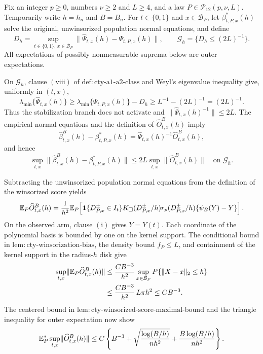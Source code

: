 Fix an integer \(p\geq0\), numbers \(\nu\geq2\) and \(L\geq4\), and a law \(P\in\mathcal P_{12}(p,\nu,L)\).  Temporarily write \(h=h_n\) and \(B=B_n\).  For \(t\in\{0,1\}\) and \(x\in\mathcal B_P\), let \(\beta^*_{t,P,x}(h)\) solve the original, unwinsorized population normal equations, and define
\[
 D_h=\sup_{t\in\{0,1\},\,x\in\mathcal B_P}
 \lVert\widehat\Psi_{t,x}(h)-\Psi_{t,P,x}(h)\rVert,
 \qquad
 \mathcal G_h=\{D_h\leq(2L)^{-1}\}.
\]
All expectations of possibly nonmeasurable suprema below are outer expectations.

On \(\mathcal G_h\), clause \(\mathrm{(viii)}\) of \(\mathrm{def:cty\text{-}a1\text{-}a2\text{-}class}\) and Weyl's eigenvalue inequality give, uniformly in \((t,x)\),
\[
 \lambda_{\min}\{\widehat\Psi_{t,x}(h)\}
 \geq \lambda_{\min}\{\Psi_{t,P,x}(h)\}-D_h
 \geq L^{-1}-(2L)^{-1}=(2L)^{-1}.
\]
Thus the stabilization branch does not activate and \(\lVert\widehat\Psi_{t,x}(h)^{-1}\rVert\leq2L\).  The empirical normal equations and the definition of \(\widehat O^B_{t,x}(h)\) imply
\[
 \widehat\beta^B_{t,x}(h)-\beta^*_{t,P,x}(h)
 =\widehat\Psi_{t,x}(h)^{-1}\widehat O^B_{t,x}(h),
\]
and hence
\[
 \sup_{t,x}\lVert\widehat\beta^B_{t,x}(h)-\beta^*_{t,P,x}(h)\rVert
 \leq 2L\sup_{t,x}\lVert\widehat O^B_{t,x}(h)\rVert
 \quad\text{on }\mathcal G_h.
\]

Subtracting the unwinsorized population normal equations from the definition of the winsorized score yields
\[
 \mathbb E_P\widehat O^B_{t,x}(h)
 ={1\over h^2}\mathbb E_P\!\left[
 \mathbf1\{D^{\pm}_{P,x}\in I_t\}K_\square(D^{\pm}_{P,x}/h)
 r_p(D^{\pm}_{P,x}/h)\{\psi_B(Y)-Y\}
 \right].
\]
On the observed arm, clause \(\mathrm{(i)}\) gives \(Y=Y(t)\).  Each coordinate of the polynomial basis is bounded by one on the kernel support.  The conditional bound in \(\mathrm{lem:cty\text{-}winsorization\text{-}bias}\), the density bound \(f_P\leq L\), and containment of the kernel support in the radius-\(h\) disk give
\[
\begin{split}
 \sup_{t,x}\lVert\mathbb E_P\widehat O^B_{t,x}(h)\rVert
 &\leq {CB^{-3}\over h^2}
 \sup_{x\in\mathcal B_P}P\{\lVert X-x\rVert_2\leq h\}\\
 &\leq {CB^{-3}\over h^2}\,L\pi h^2
 \leq CB^{-3}.
\end{split}
\]
The centered bound in \(\mathrm{lem:cty\text{-}winsorized\text{-}score\text{-}maximal\text{-}bound}\) and the triangle inequality for outer expectation now show
\[
 \mathbb E_P^*\sup_{t,x}\lVert\widehat O^B_{t,x}(h)\rVert
 \leq C\left\{B^{-3}+\sqrt{{\log(B/h)\over nh^2}}
 +{B\log(B/h)\over nh^2}\right\}.
\]


